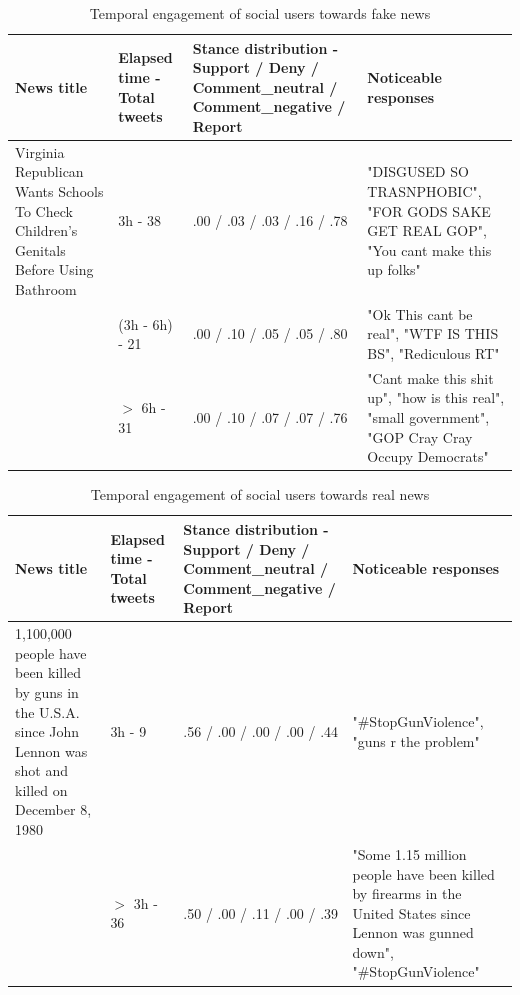 \documentclass[fyp]{socreport}
\theoremstyle{definition}
\theoremstyle{hypothesis}
\begin{document}
\begin{table}[t]
  \centering
  \tiny
  \begin{tabular}{|p{4cm}||p{1.5cm}|p{3cm}|p{5cm}|}
    \hline
    News title & Elapsed time - Total tweets  & Stance distribution - Support / Deny / Comment\_neutral / Comment\_negative / Report & Noticeable responses \\ \hline \hline
  Virginia Republican Wants Schools To Check Children's Genitals Before Using Bathroom & 3h - 38 & .00 / .03 / .03 / .16 / .78 & "DISGUSED SO TRASNPHOBIC", "FOR GODS SAKE  GET REAL GOP", "You cant make this up folks" \\ \cline{2-4}
  & (3h - 6h) - 21 & .00 / .10 / .05 / .05 / .80 & "Ok This cant be real", "WTF IS THIS BS", "Rediculous RT" \\ \cline{2-4}
  & $>$ 6h - 31 & .00 / .10 / .07 / .07 / .76 & "Cant make this shit up", "how is this real", "small government", "GOP Cray Cray  Occupy Democrats" \\ \hline
  \end{tabular}
  \caption{Temporal engagement of social users towards fake news}
  \label{table:temporal_engagement_fake}
\end{table}

\begin{table}[t]
  \centering
  \tiny
  \begin{tabular}{|p{4cm}||p{1.5cm}|p{3cm}|p{5cm}|}
    \hline
    News title & Elapsed time - Total tweets  & Stance distribution - Support / Deny / Comment\_neutral / Comment\_negative / Report & Noticeable responses \\ \hline \hline
  1,100,000 people have been killed by guns in the U.S.A. since John Lennon was shot and killed on December 8, 1980 & 3h - 9 & .56 / .00 / .00 / .00 / .44 & "\#StopGunViolence", "guns r the problem" \\ \cline{2-4}
  & $>$ 3h - 36 & .50 / .00 / .11 / .00 / .39 & "Some 1.15 million people have been killed by firearms in the United States since Lennon was gunned down", "\#StopGunViolence" \\ \hline
  \end{tabular}
  \caption{Temporal engagement of social users towards real news}
  \label{table:temporal_engagement_real}
\end{table}
\end{document}
